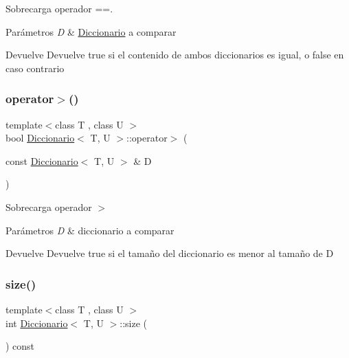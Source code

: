 Sobrecarga operador ==. 


\begin{DoxyParams}{Parámetros}
{\em D} & \hyperlink{classDiccionario}{Diccionario} a comparar \\
\hline
\end{DoxyParams}
\begin{DoxyReturn}{Devuelve}
Devuelve true si el contenido de ambos diccionarios es igual, o false en caso contrario 
\end{DoxyReturn}
\mbox{\label{classDiccionario_aed2afab1a51dd0d9805f294ff078ed7c}} 
\subsubsection{\texorpdfstring{operator$>$()}{operator>()}}
{\footnotesize\ttfamily template$<$class T , class U $>$ \\
bool \hyperlink{classDiccionario}{Diccionario}$<$ T, U $>$\+::operator$>$ (\begin{DoxyParamCaption}\item[{const \hyperlink{classDiccionario}{Diccionario}$<$ T, U $>$ \&}]{D }\end{DoxyParamCaption})}



Sobrecarga operador $>$ 


\begin{DoxyParams}{Parámetros}
{\em D} & diccionario a comparar \\
\hline
\end{DoxyParams}
\begin{DoxyReturn}{Devuelve}
Devuelve true si el tamaño del diccionario es menor al tamaño de D 
\end{DoxyReturn}
\mbox{\label{classDiccionario_aa576b001759429fd58210ca57257d6f8}} 
\subsubsection{\texorpdfstring{size()}{size()}}
{\footnotesize\ttfamily template$<$class T , class U $>$ \\
int \hyperlink{classDiccionario}{Diccionario}$<$ T, U $>$\+::size (\begin{DoxyParamCaption}{ }\end{DoxyParamCaption}) const}



